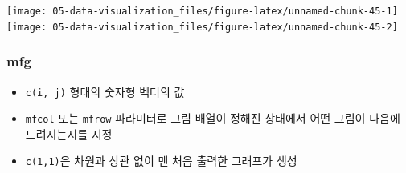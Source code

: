 \documentclass[
  11pt,
]{krantz}
\makeatletter
\providecommand{\tightlist}{%
  \setlength{\itemsep}{0pt}\setlength{\parskip}{0pt}}
\newenvironment{kframe}{%
\medskip{}
\setlength{\fboxsep}{.8em}
 \def\at@end@of@kframe{}%
 \ifinner\ifhmode%
  \def\at@end@of@kframe{\end{minipage}}%
  \begin{minipage}{\columnwidth}%
 \fi\fi%
 \def\FrameCommand##1{\hskip\@totalleftmargin \hskip-\fboxsep
 \colorbox{shadecolor}{##1}\hskip-\fboxsep
     \hskip-\linewidth \hskip-\@totalleftmargin \hskip\columnwidth}%
 \MakeFramed {\advance\hsize-\width
   \@totalleftmargin\z@ \linewidth\hsize
   \@setminipage}}%
 {\par\unskip\endMakeFramed%
 \at@end@of@kframe}
\renewenvironment{quote}{\begin{kframe}}{\end{kframe}}
\makeatother
\begin{document}
\texttt{[image: 05-data-visualization\_files/figure-latex/unnamed-chunk-45-1]} \texttt{[image: 05-data-visualization\_files/figure-latex/unnamed-chunk-45-2]}

\normalsize

\hypertarget{mfg}{%
\subsubsection*{\texorpdfstring{\textbf{mfg}}{mfg}}\label{mfg}}


\begin{quote}
\begin{itemize}
\tightlist
\item
  \texttt{c(i,\ j)} 형태의 숫자형 벡터의 값
\item
  \texttt{mfcol} 또는 \texttt{mfrow} 파라미터로 그림 배열이 정해진 상태에서 어떤 그림이 다음에 드려지는지를 지정
\item
  \texttt{c(1,1)}은 차원과 상관 없이 맨 처음 출력한 그래프가 생성
\end{itemize}
\end{quote}

\footnotesize
\end{document}
